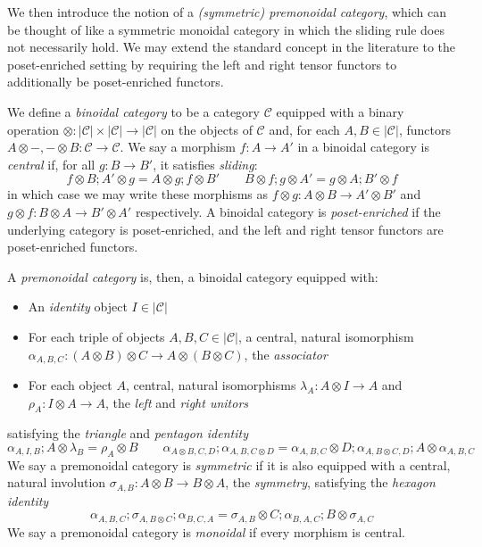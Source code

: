 \documentclass[acmsmall,screen,review]{acmart}
\newcommand{\mc}[1]{\ensuremath{\mathcal{#1}}}
\begin{document}
We then introduce the notion of a \emph{(symmetric) premonoidal category}, which can be thought of
like a symmetric monoidal category in which the sliding rule does not necessarily hold. We may
extend the standard concept in the literature to the poset-enriched setting by requiring the left
and right tensor functors to additionally be poset-enriched functors.

\begin{definition}
  We define a \emph{binoidal category} to be a category $\mc{C}$ equipped with a binary operation
  $\otimes : |\mc{C}| \times |\mc{C}| \to |\mc{C}|$ on the objects of $\mc{C}$ and, for each $A, B
  \in |\mc{C}|$, functors $A \otimes -, - \otimes B : \mc{C} \to \mc{C}$. We say a morphism $f : A
  \to A'$ in a binoidal category is \emph{central} if, for all $g : B \to B'$, it satisfies
  \emph{sliding}:
  $$
  f \otimes B ; A' \otimes g = A \otimes g ; f \otimes B' \qquad
  B \otimes f ; g \otimes A' = g \otimes A ; B' \otimes f
  $$
  in which case we may write these morphisms as $f \otimes g : A \otimes B \to A' \otimes B'$ and $g
  \otimes f : B \otimes A \to B' \otimes A'$ respectively. A binoidal category is
  \emph{poset-enriched} if the underlying category is poset-enriched, and the left and right tensor
  functors are poset-enriched functors.
  
  A \emph{premonoidal category} is, then, a
  binoidal category equipped with:
  \begin{itemize}
    \item An \emph{identity} object $I \in |\mc{C}|$
    \item For each triple of objects $A, B, C \in |\mc{C}|$, a central, natural isomorphism
    $\alpha_{A, B, C} : (A \otimes B) \otimes C \to A \otimes (B \otimes C)$, the \emph{associator}
    \item For each object $A$, central, natural isomorphisms $\lambda_A : A \otimes I \to A$ and
    $\rho_A : I \otimes A \to A$, the \emph{left} and \emph{right unitors}
  \end{itemize}
  satisfying the \emph{triangle} and \emph{pentagon identity}
  $$
  \alpha_{A, I, B} ; A \otimes \lambda_B = \rho_A \otimes B \qquad
  \alpha_{A \otimes B, C, D} ; \alpha_{A, B, C \otimes D}
  = \alpha_{A, B, C} \otimes D ; \alpha_{A, B \otimes C, D} ; A \otimes \alpha_{A, B, C}
  $$
  We say a premonoidal category is \emph{symmetric} if it is also equipped with a central, natural
  involution $\sigma_{A, B} : A \otimes B \to B \otimes A$, the \textit{symmetry}, satisfying the
  \emph{hexagon identity}
  $$
  \alpha_{A, B, C} ; \sigma_{A, B \otimes C} ; \alpha_{B, C, A}
  = \sigma_{A, B} \otimes C ; \alpha_{B, A, C} ; B \otimes \sigma_{A, C}
  $$
  We say a premonoidal category is \emph{monoidal} if every morphism is central.
\end{definition}
\end{document}
